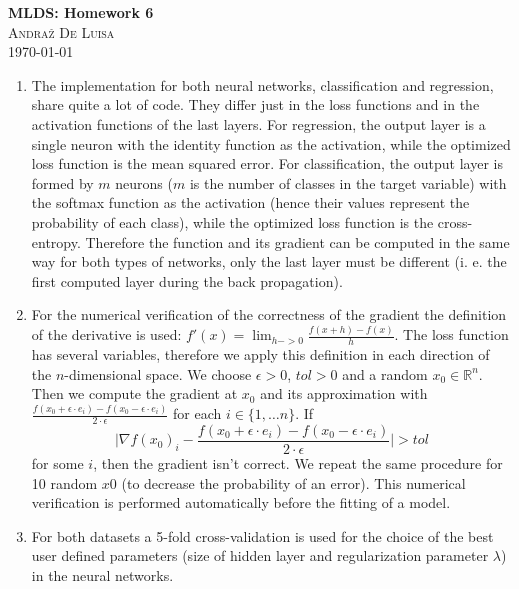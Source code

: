 \documentclass[twocolumn]{article}
\begin{document}
\begin{center}

\Large{\textbf{MLDS: Homework 6}} \\
\textsc{\large{Andraž De Luisa}} \\
\vspace{6pt}
\small{\today}

\end{center}

\begin{enumerate}
    \item The implementation for both neural networks, classification and regression, share quite a lot of code. They differ just in the loss functions and in the activation functions of the last layers. For regression, the output layer is a single neuron with the identity function as the activation, while the optimized loss function is the mean squared error. For classification, the output layer is formed by $m$ neurons ($m$ is the number of classes in the target variable) with the softmax function as the activation (hence their values represent the probability of each class), while the optimized loss function is the cross-entropy. Therefore the function and its gradient can be computed in the same way for both types of networks, only the last layer must be different (i. e. the first computed layer during the back propagation).
    \item For the numerical verification of the correctness of the gradient the definition of the derivative is used: $f'(x) = \lim_{h -> 0} \frac{f(x+h) - f(x)}{h}$. The loss function has several variables, therefore we apply this definition in each direction of the $n$-dimensional space. We choose $\epsilon > 0$, $tol > 0$ and a random $x_0 \in \mathbb{R}^n$. Then we compute the gradient at $x_0$ and its approximation with $\frac{f(x_0 + \epsilon \cdot e_i) - f(x_0 - \epsilon \cdot e_i)}{2 \cdot \epsilon}$ for each $i \in \{1, \dots n\}$. If $$\Big| \nabla f (x_0)_i - \frac{f(x_0 + \epsilon \cdot e_i) - f(x_0 - \epsilon \cdot e_i)}{2 \cdot \epsilon} \Big| > tol$$ for some $i$, then the gradient isn't correct. We repeat the same procedure for 10 random $x0$ (to decrease the probability of an error). This numerical verification is performed automatically before the fitting of a model.
    \item For both datasets a 5-fold cross-validation is used for the choice of the best user defined parameters (size of hidden layer and regularization parameter $\lambda$) in the neural networks.
        \begin{itemize}

\end{itemize}
\end{enumerate}
\end{document}
